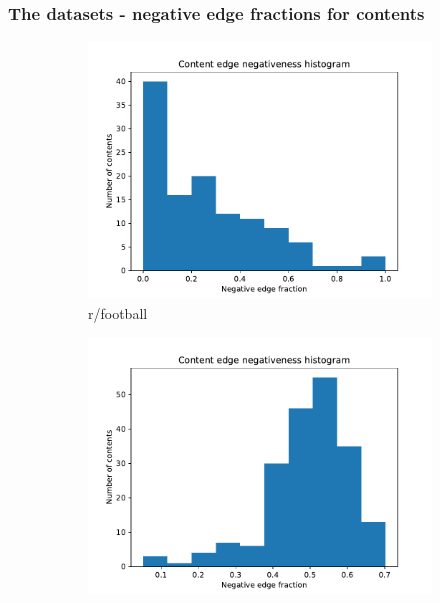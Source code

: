 \documentclass{beamer}
\begin{document}
\begin{frame}[c]
	\frametitle{The datasets - negative edge fractions for contents}
	\begin{figure}
		\begin{center}
			\begin{subfigure}[b]{0.4\textwidth}
				\centering
				\includegraphics[width=\textwidth]{out/football200/neg-fraction-content-hist.pdf}
				\caption{r/football}
				\label{fig:out/bbcscience200/neg-fraction-content-hist.pdf}
			\end{subfigure}
			\begin{subfigure}[b]{0.4\textwidth}
				\centering
				\includegraphics[width=\textwidth]{out/asktrumpsupporters200/neg-fraction-content-hist.pdf}

\end{subfigure}
\end{center}
\end{figure}
\end{frame}
\end{document}
